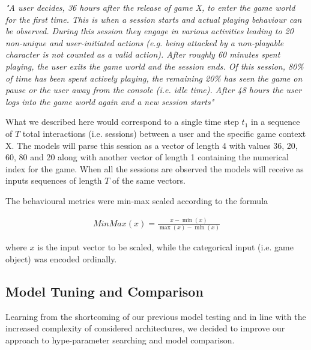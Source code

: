 \textit{
"A user decides, 36 hours after the release of game X, to enter the game world for the first time. This is when a session starts and actual playing behaviour can be observed. During this session they engage in various activities leading to 20 non-unique and user-initiated actions (e.g. being attacked by a non-playable character is not counted as a valid action). After roughly 60 minutes spent playing, the user exits the game world and the session ends. Of this session, 80\% of time has been spent actively playing, the remaining 20\% has seen the game on pause or the user away from the console (i.e. idle time). After 48 hours the user logs into the game world again and a new session starts"}

What we described here would correspond to a single time step $t_{1}$ in a sequence of $T$ total interactions (i.e. sessions) between a user and the specific game context X. The models will parse this session as a vector of length 4 with values 36, 20, 60, 80 and 20 along with another vector of length 1 containing the numerical index for the game. When all the sessions are observed the models will receive as inputs sequences of length $T$ of the same vectors. 

The behavioural metrics were min-max scaled according to the formula

\begin{equation}
  \begin{gathered} 
  \label{min_max}
        MinMax(x) =\frac{x - \min(x)} {\max(x) - \min(x)} 
  \end{gathered}
\end{equation}

where $x$ is the input vector to be scaled, while the categorical input (i.e. game object) was encoded ordinally.

\subsection{Model Tuning and Comparison}
\label{tuning_comparison_2}
Learning from the shortcoming of our previous model testing and in line with the increased complexity of considered architectures, we decided to improve our approach to hype-parameter searching and model comparison. 

